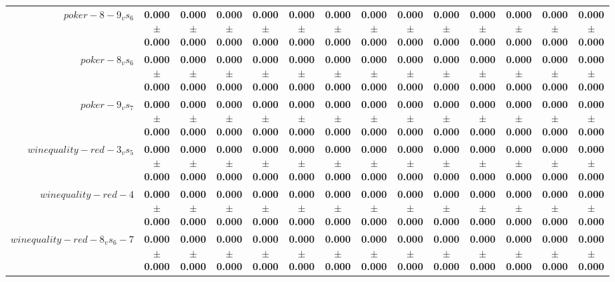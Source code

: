 \begin{table}[!ht]
{\begin{tabular}{r c c c c c c c c c c c c c}
$poker-8-9_vs_6$ & \textbf{0.000 $\pm$ 0.000} & \textbf{0.000 $\pm$ 0.000} & \textbf{0.000 $\pm$ 0.000} & \textbf{0.000 $\pm$ 0.000} & \textbf{0.000 $\pm$ 0.000} & \textbf{0.000 $\pm$ 0.000} & \textbf{0.000 $\pm$ 0.000} & \textbf{0.000 $\pm$ 0.000} & \textbf{0.000 $\pm$ 0.000} & \textbf{0.000 $\pm$ 0.000} & \textbf{0.000 $\pm$ 0.000} & \textbf{0.000 $\pm$ 0.000} & \textbf{0.000 $\pm$ 0.000} \\
$poker-8_vs_6$ & \textbf{0.000 $\pm$ 0.000} & \textbf{0.000 $\pm$ 0.000} & \textbf{0.000 $\pm$ 0.000} & \textbf{0.000 $\pm$ 0.000} & \textbf{0.000 $\pm$ 0.000} & \textbf{0.000 $\pm$ 0.000} & \textbf{0.000 $\pm$ 0.000} & \textbf{0.000 $\pm$ 0.000} & \textbf{0.000 $\pm$ 0.000} & \textbf{0.000 $\pm$ 0.000} & \textbf{0.000 $\pm$ 0.000} & \textbf{0.000 $\pm$ 0.000} & \textbf{0.000 $\pm$ 0.000} \\
$poker-9_vs_7$ & \textbf{0.000 $\pm$ 0.000} & \textbf{0.000 $\pm$ 0.000} & \textbf{0.000 $\pm$ 0.000} & \textbf{0.000 $\pm$ 0.000} & \textbf{0.000 $\pm$ 0.000} & \textbf{0.000 $\pm$ 0.000} & \textbf{0.000 $\pm$ 0.000} & \textbf{0.000 $\pm$ 0.000} & \textbf{0.000 $\pm$ 0.000} & \textbf{0.000 $\pm$ 0.000} & \textbf{0.000 $\pm$ 0.000} & \textbf{0.000 $\pm$ 0.000} & \textbf{0.000 $\pm$ 0.000} \\
$winequality-red-3_vs_5$ & \textbf{0.000 $\pm$ 0.000} & \textbf{0.000 $\pm$ 0.000} & \textbf{0.000 $\pm$ 0.000} & \textbf{0.000 $\pm$ 0.000} & \textbf{0.000 $\pm$ 0.000} & \textbf{0.000 $\pm$ 0.000} & \textbf{0.000 $\pm$ 0.000} & \textbf{0.000 $\pm$ 0.000} & \textbf{0.000 $\pm$ 0.000} & \textbf{0.000 $\pm$ 0.000} & \textbf{0.000 $\pm$ 0.000} & \textbf{0.000 $\pm$ 0.000} & \textbf{0.000 $\pm$ 0.000} \\
$winequality-red-4$ & \textbf{0.000 $\pm$ 0.000} & \textbf{0.000 $\pm$ 0.000} & \textbf{0.000 $\pm$ 0.000} & \textbf{0.000 $\pm$ 0.000} & \textbf{0.000 $\pm$ 0.000} & \textbf{0.000 $\pm$ 0.000} & \textbf{0.000 $\pm$ 0.000} & \textbf{0.000 $\pm$ 0.000} & \textbf{0.000 $\pm$ 0.000} & \textbf{0.000 $\pm$ 0.000} & \textbf{0.000 $\pm$ 0.000} & \textbf{0.000 $\pm$ 0.000} & \textbf{0.000 $\pm$ 0.000} \\
$winequality-red-8_vs_6-7$ & \textbf{0.000 $\pm$ 0.000} & \textbf{0.000 $\pm$ 0.000} & \textbf{0.000 $\pm$ 0.000} & \textbf{0.000 $\pm$ 0.000} & \textbf{0.000 $\pm$ 0.000} & \textbf{0.000 $\pm$ 0.000} & \textbf{0.000 $\pm$ 0.000} & \textbf{0.000 $\pm$ 0.000} & \textbf{0.000 $\pm$ 0.000} & \textbf{0.000 $\pm$ 0.000} & \textbf{0.000 $\pm$ 0.000} & \textbf{0.000 $\pm$ 0.000} & \textbf{0.000 $\pm$ 0.000} \\

\end{tabular}}
\end{table}
